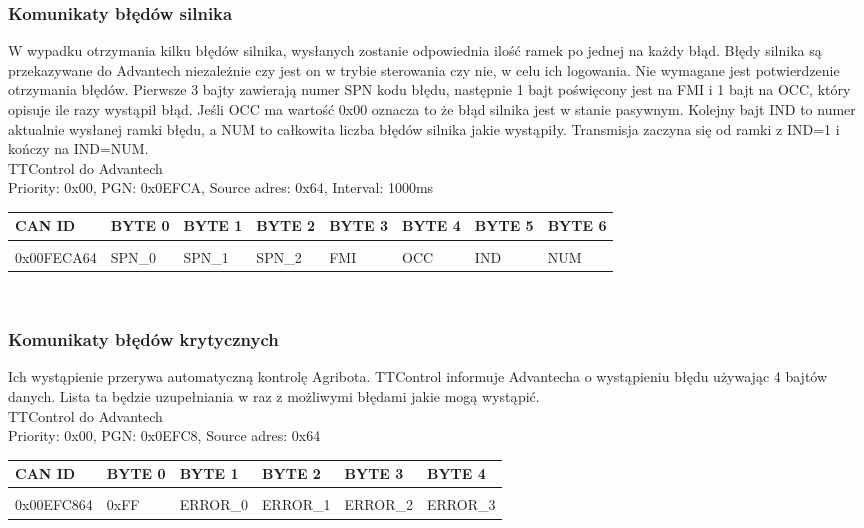 \documentclass{article}
\begin{document}
\subsubsection{Komunikaty błędów silnika}
W wypadku otrzymania kilku błędów silnika, wysłanych zostanie odpowiednia ilość ramek po jednej na każdy błąd. Błędy silnika są przekazywane do Advantech niezależnie czy jest on w trybie sterowania czy nie, w celu ich logowania. Nie wymagane jest potwierdzenie otrzymania błędów. Pierwsze 3 bajty zawierają numer SPN kodu błędu, następnie 1 bajt poświęcony jest na FMI i 1 bajt na OCC, który opisuje ile razy wystąpił błąd. Jeśli OCC ma wartość 0x00 oznacza to że błąd silnika jest w stanie pasywnym. Kolejny bajt IND to numer aktualnie wysłanej ramki błędu, a NUM to całkowita liczba błędów silnika jakie wystąpiły. Transmisja zaczyna się od ramki z IND=1 i kończy na IND=NUM.\\

TTControl do Advantech\\
Priority: 0x00, PGN: 0x0EFCA, Source adres: 0x64, Interval: 1000ms\\
\begin{left}
\begin{tabular}{ |p{2cm}|p{1.7cm}|p{1.7cm}|p{1.7cm}|p{1.7cm}|p{1.7cm}|p{1.7cm}|p{1.7cm}|} 
 \hline
 CAN ID & BYTE 0 & BYTE 1 & BYTE 2 & BYTE 3 & BYTE 4 & BYTE 5 & BYTE 6\\ \hline
 & & & & & & & \\
0x00FECA64 & SPN\_0 & SPN\_1 & SPN\_2 & FMI & OCC & IND & NUM\\ 
 \hline
\end{tabular}
\end{left}\\

\subsubsection{Komunikaty błędów krytycznych}
Ich wystąpienie przerywa automatyczną kontrolę Agribota. TTControl informuje Advantecha o wystąpieniu błędu używając 4 bajtów danych. Lista ta będzie uzupełniania w raz z możliwymi błędami jakie mogą wystąpić.\\
TTControl do Advantech\\
Priority: 0x00, PGN: 0x0EFC8, Source adres: 0x64\\
\begin{left}
\begin{tabular}{ |p{2cm}|p{1.5cm}|p{1.5cm}|p{1.5cm}|p{1.5cm}|p{1.5cm}|}  
 \hline
 CAN ID & BYTE 0 & BYTE 1  & BYTE 2 & BYTE 3 & BYTE 4\\ \hline
 & & & & &\\
 0x00EFC864 & 0xFF & ERROR\_0 & ERROR\_1 & ERROR\_2 & ERROR\_3\\ 
 \hline
\end{tabular}
\end{left}\\
\end{document}
